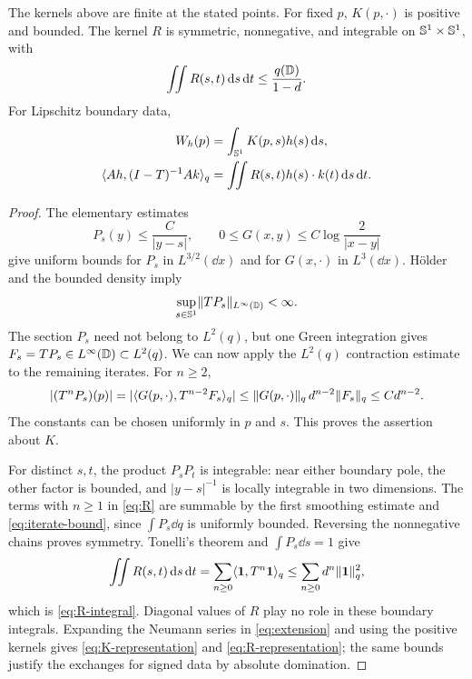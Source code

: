 \begin{lemma}\label{lem:kernel-estimates}
The kernels above are finite at the stated points. For fixed $p$, $K(p,\cdot)$ is positive and bounded. The kernel $R$ is symmetric, nonnegative, and integrable on $\mathbb S^1\times\mathbb S^1$, with
\begin{equation}\label{eq:R-integral}
\iint R(s,t)\,\mathrm d s\,\mathrm d t\le\frac{q(\mathbb D)}{1-d}.
\end{equation}
For Lipschitz boundary data,
\begin{align}
W_h(p)&=\int_{\mathbb S^1}K(p,s)h(s)\,\mathrm d s,\label{eq:K-representation}\\
\langle Ah,(I-T)^{-1}Ak\rangle_q
&=\iint R(s,t)h(s)\cdot k(t)\,\mathrm d s\,\mathrm d t.\label{eq:R-representation}
\end{align}
\end{lemma}
\begin{proof}
The elementary estimates
\[
P_s(y)\le\frac C{|y-s|},\qquad
0\le G(x,y)\le C\log\frac2{|x-y|}
\]
give uniform bounds for $P_s$ in $L^{3/2}(\dd x)$ and for $G(x,\cdot)$ in $L^3(\dd x)$. H\"older and the bounded density imply
\[
\sup_{s\in\mathbb S^1}\lVert TP_s\rVert_{L^\infty(\mathbb D)}<\infty.
\]
The section $P_s$ need not belong to $L^2(q)$, but one Green integration gives $F_s=TP_s\in L^\infty(\mathbb D)\subset L^2(q)$. We can now apply the $L^2(q)$ contraction estimate to the remaining iterates. For $n\ge2$,
\begin{equation}\label{eq:iterate-bound}
|(T^nP_s)(p)|
=|\langle G(p,\cdot),T^{n-2}F_s\rangle_q|
\le\lVert G(p,\cdot)\rVert_q\,d^{n-2}\lVert F_s\rVert_q
\le C d^{n-2}.
\end{equation}
The constants can be chosen uniformly in $p$ and $s$. This proves the assertion about $K$.

For distinct $s,t$, the product $P_sP_t$ is integrable: near either boundary pole, the other factor is bounded, and $|y-s|^{-1}$ is locally integrable in two dimensions. The terms with $n\ge1$ in \eqref{eq:R} are summable by the first smoothing estimate and \eqref{eq:iterate-bound}, since $\int P_s\dd q$ is uniformly bounded. Reversing the nonnegative chains proves symmetry. Tonelli's theorem and $\int P_s\dd s=1$ give
\[
\iint R(s,t)\,\mathrm d s\,\mathrm d t
=\sum_{n\ge0}\langle \mathbf 1,T^n\mathbf 1\rangle_q
\le\sum_{n\ge0}d^n\lVert \mathbf 1\rVert_q^2,
\]
which is \eqref{eq:R-integral}. Diagonal values of $R$ play no role in these boundary integrals. Expanding the Neumann series in \eqref{eq:extension} and using the positive kernels gives \eqref{eq:K-representation} and \eqref{eq:R-representation}; the same bounds justify the exchanges for signed data by absolute domination.
\end{proof}

